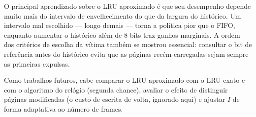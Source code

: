 \documentclass[12pt]{article}
\begin{document}
O principal aprendizado sobre o LRU aproximado é que seu desempenho depende
muito mais do intervalo de envelhecimento do que da largura do histórico. Um
intervalo mal escolhido --- longo demais --- torna a política pior que o FIFO,
enquanto aumentar o histórico além de 8 bits traz ganhos marginais. A ordem
dos critérios de escolha da vítima também se mostrou essencial: consultar o
bit de referência antes do histórico evita que as páginas recém-carregadas
sejam sempre as primeiras expulsas.

Como trabalhos futuros, cabe comparar o LRU aproximado com o LRU exato e com o
algoritmo do relógio (segunda chance), avaliar o efeito de distinguir páginas
modificadas (o custo de escrita de volta, ignorado aqui) e ajustar $I$ de forma
adaptativa ao número de frames.



\end{document}
